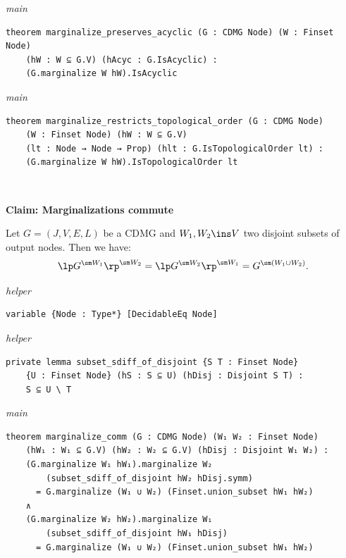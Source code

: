 {\small\textit{main}}
\begin{verbatim}
theorem marginalize_preserves_acyclic (G : CDMG Node) (W : Finset Node)
    (hW : W ⊆ G.V) (hAcyc : G.IsAcyclic) :
    (G.marginalize W hW).IsAcyclic
\end{verbatim}
{\small\textit{main}}
\begin{verbatim}
theorem marginalize_restricts_topological_order (G : CDMG Node)
    (W : Finset Node) (hW : W ⊆ G.V)
    (lt : Node → Node → Prop) (hlt : G.IsTopologicalOrder lt) :
    (G.marginalize W hW).IsTopologicalOrder lt
\end{verbatim}
~%

\vspace{\appendixNotesGap}

\noindent\textbf{Claim: Marginalizations commute}\par\smallskip
{\appendixTexSize
\label{marginalizations-commute}
      Let $G=(J,V,E,L)$ be a CDMG and $W_1, W_2 \ins V$ two disjoint subsets of output nodes.
      Then we have:
      \[ \lp G^{\sm W_1} \rp^{\sm W_2} = \lp G^{\sm W_2} \rp^{\sm W_1} =  G^{\sm (W_1 \cup W_2)}. \]
\par}
\smallskip
{\small\textit{helper}}
\begin{verbatim}
variable {Node : Type*} [DecidableEq Node]
\end{verbatim}
{\small\textit{helper}}
\begin{verbatim}
private lemma subset_sdiff_of_disjoint {S T : Finset Node}
    {U : Finset Node} (hS : S ⊆ U) (hDisj : Disjoint S T) :
    S ⊆ U \ T
\end{verbatim}
{\small\textit{main}}
\begin{verbatim}
theorem marginalize_comm (G : CDMG Node) (W₁ W₂ : Finset Node)
    (hW₁ : W₁ ⊆ G.V) (hW₂ : W₂ ⊆ G.V) (hDisj : Disjoint W₁ W₂) :
    (G.marginalize W₁ hW₁).marginalize W₂
        (subset_sdiff_of_disjoint hW₂ hDisj.symm)
      = G.marginalize (W₁ ∪ W₂) (Finset.union_subset hW₁ hW₂)
    ∧
    (G.marginalize W₂ hW₂).marginalize W₁
        (subset_sdiff_of_disjoint hW₁ hDisj)
      = G.marginalize (W₁ ∪ W₂) (Finset.union_subset hW₁ hW₂)
\end{verbatim}
~%

